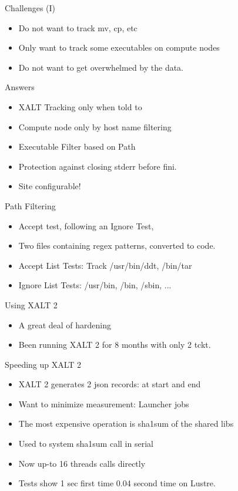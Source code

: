 \documentclass{beamer}
\begin{document}
\begin{frame}{Challenges (I)}
  \begin{itemize}
    \item Do not want to track mv, cp, etc
    \item Only want to track some executables on compute nodes
    \item Do not want to get overwhelmed by the data. 
  \end{itemize}
\end{frame}

\begin{frame}{Answers}
  \begin{itemize}
    \item XALT Tracking only when told to
    \item Compute node only by host name filtering
    \item Executable Filter based on Path
    \item Protection against closing stderr before fini.
    \item Site configurable!
  \end{itemize}
\end{frame}

\begin{frame}{Path Filtering}
  \begin{itemize}
    \item Accept test, following an Ignore Test,
    \item Two files containing regex patterns, converted to code.
    \item Accept List Tests: Track /usr/bin/ddt, /bin/tar
    \item Ignore List Tests: /usr/bin, /bin, /sbin, ...
  \end{itemize}
\end{frame}

\begin{frame}{Using XALT 2}
  \begin{itemize}
    \item A great deal of hardening 
    \item Been running XALT 2 for 8 months with only 2 tckt.
  \end{itemize}
\end{frame}

\begin{frame}{Speeding up XALT 2}
  \begin{itemize}
    \item XALT 2 generates 2 json records: at start and end
    \item Want to minimize measurement: Launcher jobs
    \item The most expensive operation is sha1sum of the shared libs
    \item Used to system sha1sum call in serial
    \item Now up-to 16 threads calls directly
    \item Tests show 1 sec first time 0.04 second time on Lustre.
  \end{itemize}
\end{frame}
\end{document}
